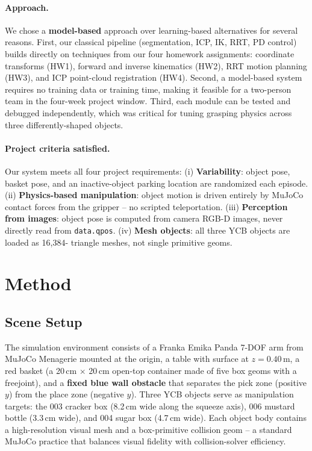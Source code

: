 \documentclass[11pt]{article}
\begin{document}
\paragraph{Approach.} We chose a \textbf{model-based} approach over
learning-based alternatives for several reasons. First, our classical
pipeline (segmentation, ICP, IK, RRT, PD control) builds directly on
techniques from our four homework assignments: coordinate transforms (HW1),
forward and inverse kinematics (HW2), RRT motion planning (HW3), and ICP
point-cloud registration (HW4). Second, a model-based system requires no
training data or training time, making it feasible for a two-person team in
the four-week project window. Third, each module can be tested and debugged
independently, which was critical for tuning grasping physics across three
differently-shaped objects.

\paragraph{Project criteria satisfied.}
Our system meets all four project requirements:
(i) \textbf{Variability}: object pose, basket pose, and an inactive-object
parking location are randomized each episode.
(ii) \textbf{Physics-based manipulation}: object motion is driven entirely
by MuJoCo contact forces from the gripper -- no scripted teleportation.
(iii) \textbf{Perception from images}: object pose is computed from camera
RGB-D images, never directly read from \texttt{data.qpos}.
(iv) \textbf{Mesh objects}: all three YCB objects are loaded as 16{,}384-
triangle meshes, not single primitive geoms.

\section{Method}

\subsection{Scene Setup}

The simulation environment consists of a Franka
Emika Panda 7-DOF arm from MuJoCo Menagerie mounted at the origin, a table
with surface at $z = 0.40$\,m, a red basket (a 20\,cm $\times$ 20\,cm
open-top container made of five box geoms with a freejoint), and a
\textbf{fixed blue wall obstacle} that separates the pick zone (positive
$y$) from the place zone (negative $y$). Three YCB objects serve as
manipulation targets: the 003 cracker box (8.2\,cm wide along the squeeze
axis), 006 mustard bottle (3.3\,cm wide), and 004 sugar box (4.7\,cm wide).
Each object body contains a high-resolution visual mesh and a box-primitive
collision geom -- a standard MuJoCo practice that balances visual fidelity
with collision-solver efficiency.
\end{document}
